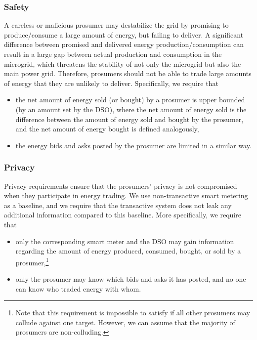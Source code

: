 \subsubsection{Safety}
A careless or malicious prosumer may destabilize the grid by promising
to produce/consume a large amount of energy, but failing to
deliver.  A significant difference between promised and
delivered energy production/consumption can result in a large gap
between actual production and consumption in the microgrid, which
threatens the stability of not only the microgrid but also the main
power grid.  Therefore, prosumers should not be able to trade large
amounts of energy that they are unlikely to deliver.
Specifically, we require that 
\begin{itemize}[noitemsep,topsep=-\parskip]
\item the net amount of energy sold (or bought) by a prosumer is upper
  bounded (by an amount set by the DSO), where the net amount of
  energy sold is the difference between the amount of energy sold and
  bought by the prosumer, and the net amount of energy bought is
  defined analogously,
\item the energy bids and asks posted by the prosumer are limited in a
  similar way.
\end{itemize}

\subsubsection{Privacy} 
Privacy requirements ensure that the prosumers' privacy is not
compromised when they participate in energy trading.  We use
non-transactive smart metering as a baseline, and we require that
the transactive system does not leak any additional information
compared to this baseline.  More specifically, we require that
\begin{itemize}[noitemsep,topsep=-\parskip]
\item only the corresponding smart meter and the DSO may gain
  information regarding the amount of energy produced, consumed,
  bought, or sold by a prosumer,\footnote{Note that this requirement
    is impossible to satisfy if all other prosumers may collude
    against one target. However, we can assume that the majority of
    prosumers are non-colluding.}
\item only the prosumer may know which bids and asks it has posted,
  and no one can know who traded energy with whom.
\end{itemize}


